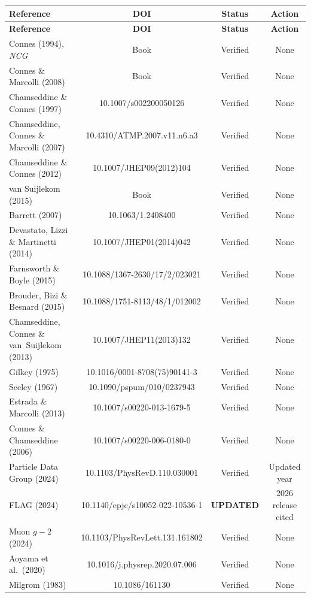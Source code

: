 \documentclass[11pt,a4paper]{article}
\begin{document}
\begin{center}
\begin{longtable}{lccc}
\toprule
\textbf{Reference} & \textbf{DOI} & \textbf{Status} & \textbf{Action} \\
\midrule
\endfirsthead
\toprule
\textbf{Reference} & \textbf{DOI} & \textbf{Status} & \textbf{Action} \\
\midrule
\endhead
Connes (1994), \textit{NCG} & Book & Verified & None \\
Connes \& Marcolli (2008) & Book & Verified & None \\
Chamseddine \& Connes (1997) & 10.1007/s002200050126 & Verified & None \\
Chamseddine, Connes \& Marcolli (2007) & 10.4310/ATMP.2007.v11.n6.a3 & Verified & None \\
Chamseddine \& Connes (2012) & 10.1007/JHEP09(2012)104 & Verified & None \\
van Suijlekom (2015) & Book & Verified & None \\
Barrett (2007) & 10.1063/1.2408400 & Verified & None \\
Devastato, Lizzi \& Martinetti (2014) & 10.1007/JHEP01(2014)042 & Verified & None \\
Farnsworth \& Boyle (2015) & 10.1088/1367-2630/17/2/023021 & Verified & None \\
Brouder, Bizi \& Besnard (2015) & 10.1088/1751-8113/48/1/012002 & Verified & None \\
Chamseddine, Connes \& van~Suijlekom (2013) & 10.1007/JHEP11(2013)132 & Verified & None \\
Gilkey (1975) & 10.1016/0001-8708(75)90141-3 & Verified & None \\
Seeley (1967) & 10.1090/pspum/010/0237943 & Verified & None \\
Estrada \& Marcolli (2013) & 10.1007/s00220-013-1679-5 & Verified & None \\
Connes \& Chamseddine (2006) & 10.1007/s00220-006-0180-0 & Verified & None \\
Particle Data Group (2024) & 10.1103/PhysRevD.110.030001 & Verified & Updated year \\
FLAG (2024) & 10.1140/epjc/s10052-022-10536-1 & \textbf{UPDATED} & 2026 release cited \\
Muon $g-2$ (2024) & 10.1103/PhysRevLett.131.161802 & Verified & None \\
Aoyama et al.\ (2020) & 10.1016/j.physrep.2020.07.006 & Verified & None \\
Milgrom (1983) & 10.1086/161130 & Verified & None \\

\end{longtable}
\end{center}
\end{document}
